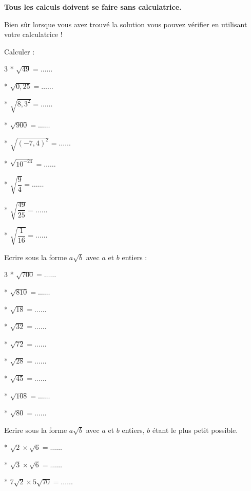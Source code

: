 
{\bf \large  Tous les calculs doivent se faire sans calculatrice.}

Bien sûr lorsque vous avez trouvé la solution vous pouvez vérifier en utilisant votre calculatrice !

\exo 

Calculer :

\begin{multicols}{3}
* $\sqrt{49}=\ldots\ldots$

* $\sqrt{0,25}=\ldots\ldots$

* $\sqrt{8,3^2}=\ldots\ldots$

* $\sqrt{900}=\ldots\ldots$

* $\sqrt{(-7,4)^2}=\ldots\ldots$

* $\sqrt{10^{-24}}=\ldots\ldots$

* $\sqrt{\dfrac{9}{4}}=\ldots\ldots$

* $\sqrt{\dfrac{49}{25}}=\ldots\ldots$

* $\sqrt{\dfrac{1}{16}}=\ldots\ldots$

\end{multicols}

\medskip


\exo 

Ecrire sous la forme $a\sqrt{b}$ avec $a$ et $b$ entiers :

\begin{multicols}{3}
* $\sqrt{700}=\ldots\ldots$

* $\sqrt{810}=\ldots\ldots$

* $\sqrt{18}=\ldots\ldots$

* $\sqrt{32}=\ldots\ldots$

* $\sqrt{72}=\ldots\ldots$

* $\sqrt{28}=\ldots\ldots$

* $\sqrt{45}=\ldots\ldots$

* $\sqrt{108}=\ldots\ldots$

* $\sqrt{80}=\ldots\ldots$

\end{multicols}

\medskip

\exo

Ecrire sous la forme $a\sqrt{b}$ avec $a$ et $b$ entiers, $b$ étant le plus petit possible.

* $\sqrt{2}\times \sqrt{6}=\ldots\ldots$

* $\sqrt{3}\times \sqrt{6}=\ldots\ldots$

* $7\sqrt{2}\times 5\sqrt{70}=\ldots\ldots$

